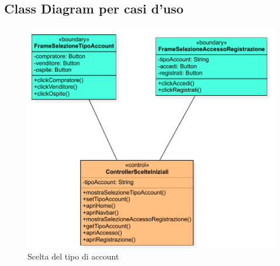         \subsection{Class Diagram per casi d'uso}
            \begin{figure}[htbp!]
                \centering
                    \includegraphics[width=1\linewidth]{Immagini/Diagrammi/Class Diagram/Utente che non ha effettuato l'accesso/ScelteIniziali.pdf}
                \caption{Scelta del tipo di account}
            \end{figure}
            
